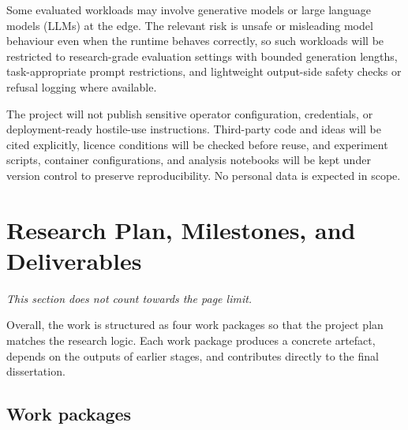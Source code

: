 \documentclass[a4paper,11pt]{article}
\begin{document}
Some evaluated workloads may involve generative models or large language models (LLMs) at the edge. The relevant risk is unsafe or misleading model behaviour even when the runtime behaves correctly, so such workloads will be restricted to research-grade evaluation settings with bounded generation lengths, task-appropriate prompt restrictions, and lightweight output-side safety checks or refusal logging where available.

The project will not publish sensitive operator configuration, credentials, or deployment-ready hostile-use instructions. Third-party code and ideas will be cited explicitly, licence conditions will be checked before reuse, and experiment scripts, container configurations, and analysis notebooks will be kept under version control to preserve reproducibility. No personal data is expected in scope.

\clearpage
\section{Research Plan, Milestones, and Deliverables}
\textit{This section does not count towards the page limit.}

Overall, the work is structured as four work packages so that the project plan matches the research logic. Each work package produces a concrete artefact, depends on the outputs of earlier stages, and contributes directly to the final dissertation.

\subsection{Work packages}
\end{document}
